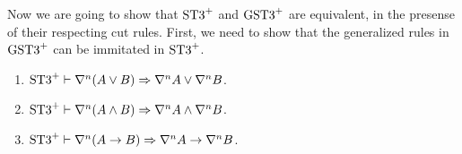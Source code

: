 \documentclass[10pt,a4paper]{amsart}
\begin{document}


Now we are going to show that $\text{ST3}^+$ and $\text{GST3}^+$ are equivalent, in the presense of their respecting cut rules. First, we need to show that the generalized rules in $\text{GST3}^+$ can be immitated in $\text{ST3}^+$.

\begin{lem}\label{lem:l-nabla-dist} \quad
	\begin{enumerate}
		\item $\text{ST3}^+ \vdash \nabla^n (A \vee B) \Rightarrow \nabla^n A \vee \nabla^n B$.
	
		\item $\text{ST3}^+ \vdash \nabla^n (A \wedge B) \Rightarrow \nabla^n A \wedge \nabla^n B$. 
	
		\item $\text{ST3}^+ \vdash \nabla^n (A \rightarrow B) \Rightarrow \nabla^n A \rightarrow \nabla^n B$.
	\end{enumerate}
\end{lem}
\end{document}
